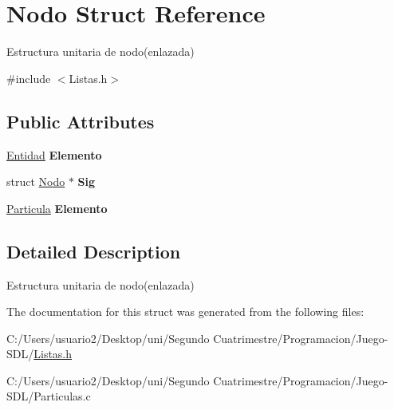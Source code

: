 \hypertarget{struct_nodo}{}\section{Nodo Struct Reference}
\label{struct_nodo}


Estructura unitaria de nodo(enlazada)  




{\ttfamily \#include $<$Listas.\+h$>$}

\subsection*{Public Attributes}
\begin{DoxyCompactItemize}
\item 
\hyperlink{struct_entidad}{Entidad} {\bfseries Elemento}\hypertarget{struct_nodo_a85ae06fdf61e5e0ab33f4a93ef96c555}{}\label{struct_nodo_a85ae06fdf61e5e0ab33f4a93ef96c555}

\item 
struct \hyperlink{struct_nodo}{Nodo} $\ast$ {\bfseries Sig}\hypertarget{struct_nodo_ae7ca239ebecad2c8ad5f88ef5ed9c280}{}\label{struct_nodo_ae7ca239ebecad2c8ad5f88ef5ed9c280}

\item 
\hyperlink{structparticula}{Particula} {\bfseries Elemento}\hypertarget{struct_nodo_a16aab53ddebbe41cd3dbd9ed4eac17fa}{}\label{struct_nodo_a16aab53ddebbe41cd3dbd9ed4eac17fa}

\end{DoxyCompactItemize}


\subsection{Detailed Description}
Estructura unitaria de nodo(enlazada) 

The documentation for this struct was generated from the following files\+:\begin{DoxyCompactItemize}
\item 
C\+:/\+Users/usuario2/\+Desktop/uni/\+Segundo Cuatrimestre/\+Programacion/\+Juego-\/\+S\+D\+L/\hyperlink{_listas_8h}{Listas.\+h}\item 
C\+:/\+Users/usuario2/\+Desktop/uni/\+Segundo Cuatrimestre/\+Programacion/\+Juego-\/\+S\+D\+L/Particulas.\+c\end{DoxyCompactItemize}
